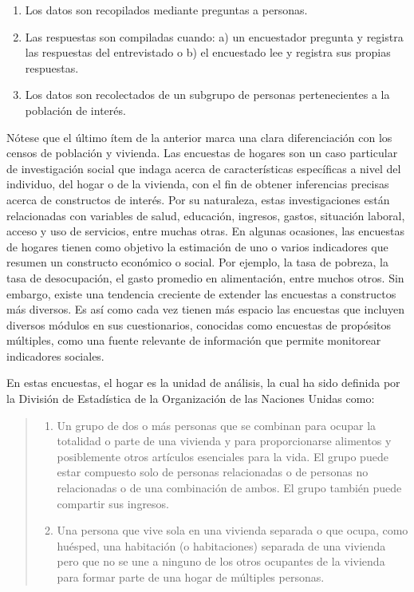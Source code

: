 \documentclass[
  12pt,
]{book}
\providecommand{\tightlist}{%
  \setlength{\itemsep}{0pt}\setlength{\parskip}{0pt}}
\begin{document}
\begin{enumerate}
\def\labelenumi{\arabic{enumi}.}
\tightlist
\item
  Los datos son recopilados mediante preguntas a personas.
\item
  Las respuestas son compiladas cuando: a) un encuestador pregunta y registra las respuestas del entrevistado o b) el encuestado lee y registra sus propias respuestas.
\item
  Los datos son recolectados de un subgrupo de personas pertenecientes a la población de interés.
\end{enumerate}

Nótese que el último ítem de la anterior marca una clara diferenciación con los censos de población y vivienda. Las encuestas de hogares son un caso particular de investigación social que indaga acerca de características específicas a nivel del individuo, del hogar o de la vivienda, con el fin de obtener inferencias precisas acerca de constructos de interés. Por su naturaleza, estas investigaciones están relacionadas con variables de salud, educación, ingresos, gastos, situación laboral, acceso y uso de servicios, entre muchas otras. En algunas ocasiones, las encuestas de hogares tienen como objetivo la estimación de uno o varios indicadores que resumen un constructo económico o social. Por ejemplo, la tasa de pobreza, la tasa de desocupación, el gasto promedio en alimentación, entre muchos otros. Sin embargo, existe una tendencia creciente de extender las encuestas a constructos más diversos. Es así como cada vez tienen más espacio las encuestas que incluyen diversos módulos en sus cuestionarios, conocidas como encuestas de propósitos múltiples, como una fuente relevante de información que permite monitorear indicadores sociales.

En estas encuestas, el hogar es la unidad de análisis, la cual ha sido definida por la División de Estadística de la Organización de las Naciones Unidas \citep{United-Nations_2011} como:

\begin{quote}
\begin{enumerate}
\def\labelenumi{\alph{enumi}.}
\tightlist
\item
  Un grupo de dos o más personas que se combinan para ocupar la totalidad o parte de una vivienda y para proporcionarse alimentos y posiblemente otros artículos esenciales para la vida. El grupo puede estar compuesto solo de personas relacionadas o de personas no relacionadas o de una combinación de ambos. El grupo también puede compartir sus ingresos.
\item
  Una persona que vive sola en una vivienda separada o que ocupa, como huésped, una habitación (o habitaciones) separada de una vivienda pero que no se une a ninguno de los otros ocupantes de la vivienda para formar parte de una hogar de múltiples personas.
\end{enumerate}
\end{quote}
\end{document}
